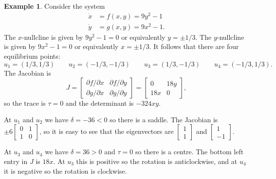 \documentclass[reqno]{amsart}
\theoremstyle{definition}
\newtheorem{example}[theorem]{Example}
\begin{document}
\begin{example}\label{eg-double-wheel}
 Consider the system
 \begin{align*}
  \dot{x} &= f(x,y) = 9y^2-1 \\
  \dot{y} &= g(x,y) = 9x^2-1.
 \end{align*} 
 The $x$-nullcline is given by $9y^2-1=0$ or equivalently $y=\pm 1/3$.
 The $y$-nullcline is given by $9x^2-1=0$ or equivalently $x=\pm 1/3$.
 It follows that there are four equilibrium points:
 \[ u_1=(1/3,1/3) \qquad
    u_2=(-1/3,-1/3) \qquad
    u_3=(1/3,-1/3) \qquad
    u_4=(-1/3,1/3).
 \]
 The Jacobian is 
 \[ J = \left[\begin{array}{cc} \partial f/\partial x & \partial f/\partial y \\
             \partial g/\partial x & \partial g/\partial y \end{array}\right]
      = \left[\begin{array}{cc} 0 & 18y \\ 18x & 0 \end{array}\right],
 \]
 so the trace is $\tau=0$ and the determinant is $-324xy$. 

 At $u_1$ and $u_2$ we have $\delta=-36<0$ so there is a saddle.  The
 Jacobian is $\pm 6\left[\begin{array}{cc} 0&1\\1&0\end{array}\right]$, so it is easy to see that the
 eigenvectors are $\left[\begin{array}{cc} 1\\ 1\end{array}\right]$ and $\left[\begin{array}{cc} 1\\ -1\end{array}\right]$.

 At $u_3$ and $u_4$ we have $\delta=36>0$ and $\tau=0$ so there is a
 centre.  The bottom left entry in $J$ is $18x$.  At $u_3$ this is
 positive so the rotation is anticlockwise, and at $u_4$ it is
 negative so the rotation is clockwise.


\end{example}
\end{document}
